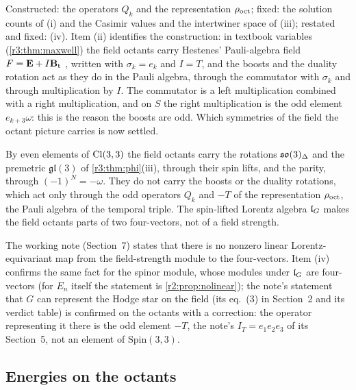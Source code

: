 Constructed: the operators $Q_k$ and the representation $\rho_{\rm oct}$; fixed: the solution counts of (i) and the Casimir values and the
intertwiner space of (iii); restated and fixed: (iv). Item (ii) identifies the construction: in textbook variables (\cref{r3:thm:maxwell}) the
field octants carry Hestenes' Pauli-algebra field $F=\mathbf E+I\mathbf B_{\rm t}$ \cite{Hestenes66}, written with $\sigma_k=e_k$ and $I=T$, and the boosts and the
duality rotation act as they do in the Pauli algebra, through the commutator with $\sigma_k$ and through multiplication by $I$. The
commutator is a left multiplication combined with a right multiplication, and on $S$ the right multiplication is the odd element
$e_{k+3}\omega$: this is the reason the boosts are odd. Which symmetries of the field the octant picture carries is now settled.

\begin{corollary}
\label{r3:cor:carries}
By even elements of $\mathrm{Cl}(3,3)$ the field octants carry the rotations $\mathfrak{so}(3)_\Delta$ and the premetric $\mathfrak{gl}(3)$ of \cref{r3:thm:phi}(iii),
through their spin lifts, and the parity, through $(-1)^N=-\omega$. They do not carry the boosts or the duality
rotations, which act only through the odd operators $Q_k$ and $-T$ of the representation $\rho_{\rm oct}$, the Pauli algebra of the temporal triple.
The spin-lifted Lorentz algebra $\mathfrak l_G$ makes the field octants parts of two four-vectors, not of a field strength.
\end{corollary}

The working note \cite{FMB} (Section~7) states that there is no nonzero linear Lorentz-equivariant map from the field-strength module to
the four-vectors. Item (iv) confirms the same fact for the spinor module, whose modules under $\mathfrak l_G$ are four-vectors (for $E_n$ itself
the statement is \cref{r2:prop:nolinear}); the note's statement that
$G$ can represent the Hodge star on the field (its eq.~(3) in Section~2 and its verdict table) is confirmed on the octants with a correction: the
operator representing it there is the odd element $-T$, the note's $I_T=e_1e_2e_3$ of its Section~5, not an element of $\mathrm{Spin}(3,3)$.

\subsection{Energies on the octants}
\label{r3:sec:energies}

